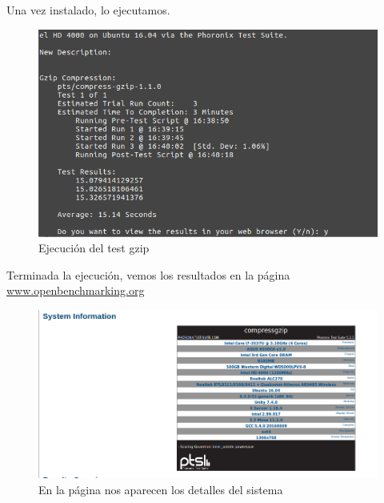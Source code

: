 Una vez instalado, lo ejecutamos.

\begin{figure}[H] %
	\centering
	\includegraphics[scale=0.5]{imagenes/run-gzip.png}  %
	\caption{Ejecución del test gzip}
\end{figure}

Terminada la ejecución, vemos los resultados en la página \url{www.openbenchmarking.org}

\begin{figure}[H] %
	\centering
	\includegraphics[scale=0.5]{imagenes/system-information.png}  %
	\caption{En la página nos aparecen los detalles del sistema}
\end{figure}


